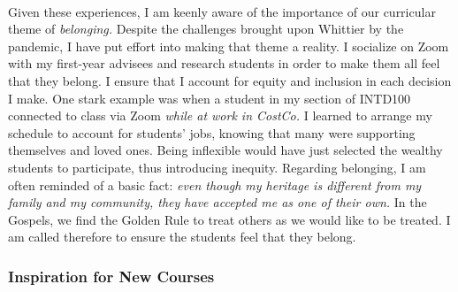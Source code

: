 \documentclass[../../main.tex]{subfiles}
\begin{document}
\\
\vspace{0.25cm}
Given these experiences, I am keenly aware of the importance of our curricular theme of \textit{belonging.}  Despite the challenges brought upon Whittier by the pandemic, I have put effort into making that theme a reality.  I socialize on Zoom with my first-year advisees and research students in order to make them all feel that they belong.  I ensure that I account for equity and inclusion in each decision I make.  One stark example was when a student in my section of INTD100 connected to class via Zoom \textit{while at work in CostCo.}  I learned to arrange my schedule to account for students' jobs, knowing that many were supporting themselves and loved ones.  Being inflexible would have just selected the wealthy students to participate, thus introducing inequity.  Regarding belonging, I am often reminded of a basic fact: \textit{even though my heritage is different from my family and my community, they have accepted me as one of their own.}  In the Gospels, we find the Golden Rule to treat others as we would like to be treated.  I am called therefore to ensure the students feel that they belong.

\subsubsection{Inspiration for New Courses}
\end{document}
